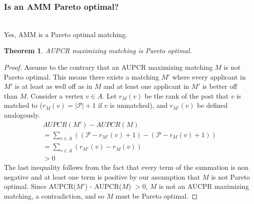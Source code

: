 \documentclass[letterpaper]{article} %
\newtheorem*{theorem}{Theorem}
\begin{document}
\subsubsection{Is an AMM Pareto optimal?} ~ \\
Yes, AMM is a Pareto optimal matching.
\begin{theorem}
AUPCR maximizing matching is Pareto optimal.
\end{theorem}
\begin{proof}
Assume to the contrary that an AUPCR maximizing matching $M$ is not Pareto optimal. This means there exists a matching $M'$ where every applicant in $M'$ is at least as well off as in $M$ and at least one applicant in $M'$ is better off than $M$. Consider a vertex $v \in A$. Let $r_{M}(v)$ be the rank of the post that $v$ is matched to ($r_{M}(v) = |\mathcal{P}|+1$ if $v$ is unmatched), and $r_{M'}(v)$ be defined analogously.
\begin{align*}
&AUPCR(M') - AUPCR(M) \\
&= \sum_{v \in A}((\mathcal{P} - r_{M'}(v) + 1) - (\mathcal{P} - r_{M}(v) + 1)) \\
&= \sum_{v \in A}(r_{M'}(v) - r_{M}(v)) \\
&> 0
\end{align*}
The last inequality follows from the fact that every term of the summation is non negative and at least one term is positive by our assumption that $M$ is not Pareto optimal.\newline
Since AUPCR($M'$) - AUPCR($M$) $> 0$, $M$ is not an AUCPR maximizing matching, a contradiction, and so $M$ must be Pareto optimal.
\end{proof}
\end{document}

